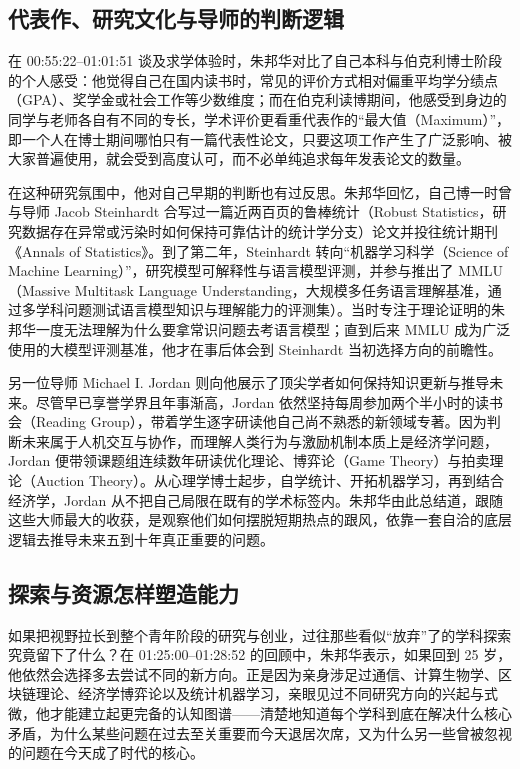 \documentclass[UTF8,a4paper,11pt,fontset=fandol]{ctexart}
\begin{document}
\subsection{代表作、研究文化与导师的判断逻辑}
在 00:55:22–01:01:51 谈及求学体验时，朱邦华对比了自己本科与伯克利博士阶段的个人感受：他觉得自己在国内读书时，常见的评价方式相对偏重平均学分绩点（GPA）、奖学金或社会工作等少数维度；而在伯克利读博期间，他感受到身边的同学与老师各自有不同的专长，学术评价更看重代表作的“最大值（Maximum）”，即一个人在博士期间哪怕只有一篇代表性论文，只要这项工作产生了广泛影响、被大家普遍使用，就会受到高度认可，而不必单纯追求每年发表论文的数量。

在这种研究氛围中，他对自己早期的判断也有过反思。朱邦华回忆，自己博一时曾与导师 Jacob Steinhardt 合写过一篇近两百页的鲁棒统计（Robust Statistics，研究数据存在异常或污染时如何保持可靠估计的统计学分支）论文并投往统计期刊《Annals of Statistics》。到了第二年，Steinhardt 转向“机器学习科学（Science of Machine Learning）”，研究模型可解释性与语言模型评测，并参与推出了 MMLU（Massive Multitask Language Understanding，大规模多任务语言理解基准，通过多学科问题测试语言模型知识与理解能力的评测集）。当时专注于理论证明的朱邦华一度无法理解为什么要拿常识问题去考语言模型；直到后来 MMLU 成为广泛使用的大模型评测基准，他才在事后体会到 Steinhardt 当初选择方向的前瞻性。

另一位导师 Michael I. Jordan 则向他展示了顶尖学者如何保持知识更新与推导未来。尽管早已享誉学界且年事渐高，Jordan 依然坚持每周参加两个半小时的读书会（Reading Group），带着学生逐字研读他自己尚不熟悉的新领域专著。因为判断未来属于人机交互与协作，而理解人类行为与激励机制本质上是经济学问题，Jordan 便带领课题组连续数年研读优化理论、博弈论（Game Theory）与拍卖理论（Auction Theory）。从心理学博士起步，自学统计、开拓机器学习，再到结合经济学，Jordan 从不把自己局限在既有的学术标签内。朱邦华由此总结道，跟随这些大师最大的收获，是观察他们如何摆脱短期热点的跟风，依靠一套自洽的底层逻辑去推导未来五到十年真正重要的问题。

\subsection{探索与资源怎样塑造能力}
如果把视野拉长到整个青年阶段的研究与创业，过往那些看似“放弃”了的学科探索究竟留下了什么？在 01:25:00–01:28:52 的回顾中，朱邦华表示，如果回到 25 岁，他依然会选择多去尝试不同的新方向。正是因为亲身涉足过通信、计算生物学、区块链理论、经济学博弈论以及统计机器学习，亲眼见过不同研究方向的兴起与式微，他才能建立起更完备的认知图谱——清楚地知道每个学科到底在解决什么核心矛盾，为什么某些问题在过去至关重要而今天退居次席，又为什么另一些曾被忽视的问题在今天成了时代的核心。
\end{document}
